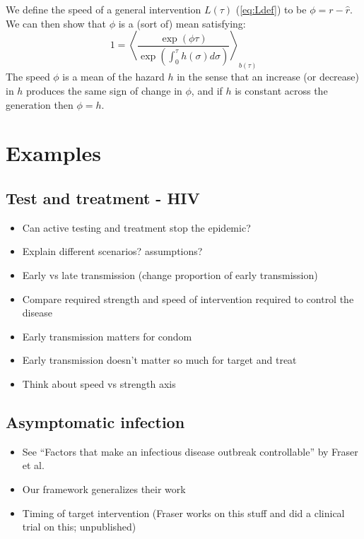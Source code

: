 \documentclass{article}\usepackage[]{graphicx}\usepackage[]{color}
\newcommand{\eqref}[1]{(\ref{eq:#1})}
\begin{document}
We define the speed of a general intervention $L(\tau)$ \eqref{Ldef} to be $\phi = r - \hat r$. We can then show that $\phi$ is a (sort of) mean satisfying:
\begin{equation}
	1 = \left\langle \frac{\exp(\phi \tau) }{\exp(\int_0^\tau h(\sigma) d\sigma)} \right\rangle_{b(\tau)}
\end{equation}
The speed $\phi$ is a mean of the hazard $h$ in the sense that an increase (or decrease) in $h$ produces the same sign of change in $\phi$, and if $h$ is constant across the generation then $\phi=h$.

\section{Examples}

\subsection{Test and treatment - HIV}

\begin{itemize}
	\item Can active testing and treatment stop the epidemic?
	\item Explain different scenarios? assumptions?
	\item Early vs late transmission (change proportion of early transmission)
	\item Compare required strength and speed of intervention required to control the disease
	\item Early transmission matters for condom
	\item Early transmission doesn't matter so much for target and treat
	\item Think about speed vs strength axis
\end{itemize}

\subsection{Asymptomatic infection}

\begin{itemize}
	\item See ``Factors that make an infectious disease outbreak controllable'' by Fraser et al.
	\item Our framework generalizes their work
	\item Timing of target intervention (Fraser works on this stuff and did a clinical trial on this; unpublished)
\end{itemize}
\end{document}
